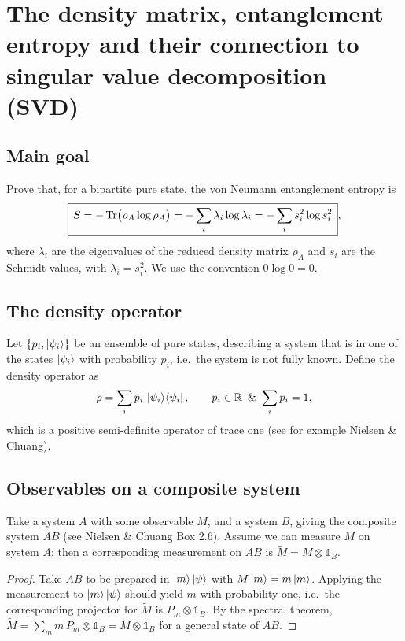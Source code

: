 \documentclass[../../main.tex]{subfiles}
\begin{document}
\section{The density matrix, entanglement entropy and their connection to singular value decomposition (SVD)}
\label{sec:density-matrix-entanglement-svd}

\subsection{Main goal}

Prove that, for a bipartite pure state, the von Neumann entanglement entropy is
\begin{equation}
\boxed{\,S=-\operatorname{Tr}\bigl(\rho_A\log\rho_A\bigr)
=-\sum_i\lambda_i\log\lambda_i
=-\sum_i s_i^2\log s_i^2\,},
\end{equation}
where $\lambda_i$ are the eigenvalues of the reduced density matrix $\rho_A$
and $s_i$ are the Schmidt values, with $\lambda_i=s_i^2$.
We use the convention $0\log 0=0$.

\subsection{The density operator}

Let $\{p_i,\left\lvert \psi_i \right\rangle\}$ be an ensemble of pure states, describing a system that is in one
of the states $\left\lvert \psi_i \right\rangle$ with probability $p_i$, i.e.\ the system is not fully known. Define
the density operator as
\begin{equation}
\rho=\sum_i p_i\,\left\lvert \psi_i \right\rangle\!\left\langle \psi_i \right\rvert,\qquad p_i\in\mathbb R\ \, \&\ \sum_i p_i=1,
\end{equation}
which is a positive semi-definite operator of trace one (see for example Nielsen \& Chuang).

\subsection{Observables on a composite system}

Take a system $A$ with some observable $M$, and a system $B$, giving the composite system
$AB$ (see Nielsen \& Chuang Box 2.6). Assume we can measure $M$ on system $A$; then a corresponding measurement
on $AB$ is $\tilde M=M\otimes\mathds{1}_B$.

\begin{proof}
Take $AB$ to be prepared in $\left\lvert m \right\rangle\left\lvert \psi \right\rangle$ with $M\left\lvert m \right\rangle=m\left\lvert m \right\rangle$. Applying the
measurement to $\left\lvert m \right\rangle\left\lvert \psi \right\rangle$ should yield $m$ with probability one, i.e.\ the
corresponding projector for $\tilde M$ is $P_m\otimes\mathds{1}_B$. By the spectral theorem,
$\tilde M=\sum_m m\,P_m\otimes\mathds{1}_B=M\otimes\mathds{1}_B$ for a general state of $AB$.
\end{proof}
\end{document}
